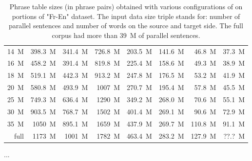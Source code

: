 \begin{table}[ht]
\begin{tabular}{ | r | r | r | r | r | r | r | r | }
14~M & 398.3~M & 341.4~M & 726.8~M & 203.5~M & 141.6~M & 46.8~M & 37.3~M \\
16~M & 458.2~M & 391.4~M & 819.8~M & 225.4~M & 158.6~M & 49.3~M & 38.9~M \\
18~M & 519.1~M & 442.3~M & 913.2~M & 247.8~M & 176.5~M & 53.2~M & 41.9~M \\
20~M & 580.8~M & 493.9~M & 1007~M & 270.7~M & 195.4~M & 57.8~M & 45.5~M \\
\hline
25~M & 749.3~M & 636.4~M & 1290~M & 349.2~M & 268.0~M & 70.6~M & 55.1~M \\
30~M & 903.5~M & 768.7~M & 1502~M & 401.4~M & 269.1~M & 90.6~M & 72.9~M \\
35~M & 1050~M & 895.1~M & 1659~M & 437.9~M & 269.7~M & 110.8~M & 91.1~M \\
full & 1173~M & 1001~M & 1782~M & 463.4~M & 283.2~M & 127.9~M & ??.?~M \\ %
\hline
\end{tabular}
\caption{\label{fr-en-output-size-benchmarking}
Phrase table sizes (in phrase pairs) obtained with various configurations of \eppex{}
on portions of "Fr-En" dataset. The input data size triple stands for: number of
parallel sentences and number of words on the source and target side.
The full corpus had more than 39~M of parallel sentences.}
\end{table}

...
